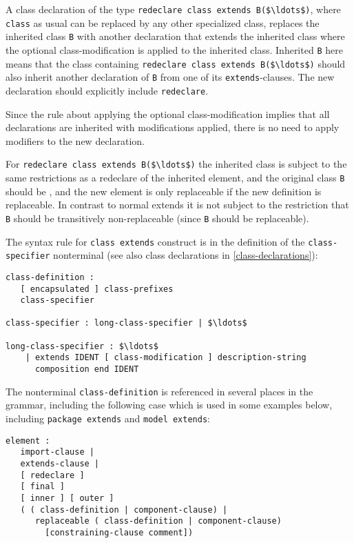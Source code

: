 A class declaration of the type \lstinline!redeclare class extends B($\ldots$)!, where \lstinline!class! as usual can be replaced by any other specialized class, replaces the inherited class \lstinline!B! with another declaration that extends the inherited class where the optional class-modification is applied to the inherited class.
Inherited \lstinline!B! here means that the class containing \lstinline!redeclare class extends B($\ldots$)! should also inherit another declaration of \lstinline!B! from one of its \lstinline!extends!-clauses.
The new declaration should explicitly include \lstinline!redeclare!.

\begin{nonnormative}
Since the rule about applying the optional class-modification implies that all declarations are inherited with modifications applied, there is no need to apply modifiers to the new declaration.
\end{nonnormative}

For \lstinline!redeclare class extends B($\ldots$)! the inherited class is subject to the same restrictions as a redeclare of the inherited element, and the original class \lstinline!B! should be , and the new element is only replaceable if the new definition is replaceable.
In contrast to normal extends it is not subject to the restriction that \lstinline!B! should be transitively non-replaceable (since \lstinline!B! should be replaceable).

The syntax rule for \lstinline!class extends! construct is in the definition of the \lstinline!class-specifier! nonterminal (see also class declarations in \cref{class-declarations}):
\begin{lstlisting}[language=grammar]
class-definition :
   [ encapsulated ] class-prefixes
   class-specifier

class-specifier : long-class-specifier | $\ldots$

long-class-specifier : $\ldots$
    | extends IDENT [ class-modification ] description-string
      composition end IDENT
\end{lstlisting}
The nonterminal \lstinline!class-definition! is referenced in several places in the grammar, including the following case which is used in some examples below, including \lstinline!package extends! and \lstinline!model extends!:
\begin{lstlisting}[language=grammar]
element :
   import-clause |
   extends-clause |
   [ redeclare ]
   [ final ]
   [ inner ] [ outer ]
   ( ( class-definition | component-clause) |
      replaceable ( class-definition | component-clause)
        [constraining-clause comment])
\end{lstlisting}

